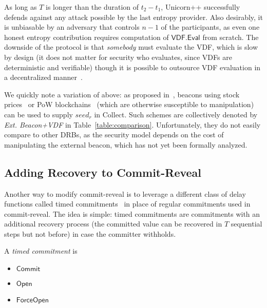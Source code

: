 As long as $T$ is longer than the duration of $t_2 - t_1$, Unicorn++ successfully defends against any attack possible by the last entropy provider. Also desirably, it is unbiasable by an adversary that controls $n - 1$ of the participants, as even one honest entropy contribution requires computation of $\mathsf{VDF.Eval}$ from scratch. The downside of the protocol is that \emph{somebody} must evaluate the VDF, which is slow by design (it does not matter for security who evaluates, since VDFs are deterministic and verifiable) though it is possible to outsource VDF evaluation in a decentralized manner~\cite{thyagarajan2021opensquare}.

We quickly note a variation of above: as proposed in~\cite{bunz2017proofs, bonneau2015bitcoin}, beacons using stock prices~\cite{clark2010use} or PoW blockchains~\cite{nakamoto2008bitcoin, bentov2016bitcoin, han2020randchain} (which are otherwise susceptible to manipulation) can be used to supply $seed_r$ in Collect. Such schemes are collectively denoted by \textit{Ext. Beacon+VDF} in Table~\ref{table:comparison}.
Unfortunately, they do not easily compare to other DRBs, as the security model depends on the cost of manipulating the external beacon, which has not yet been formally analyzed.

\subsection{Adding Recovery to Commit-Reveal}
Another way to modify commit-reveal is to leverage a different class of delay functions called timed commitments~\cite{boneh2000timed} in place of regular commitments used in commit-reveal.
The idea is simple: timed commitments are commitments with an additional recovery process (the committed value can be recovered in $T$ sequential steps but not before) in case the committer withholds.

\begin{definition}
A \textit{timed commitment} is
\begin{itemize}
\item $\mathsf{Commit}$
\item $\mathsf{Open}$
\item $\mathsf{ForceOpen}$
\end{itemize}
\end{definition}

